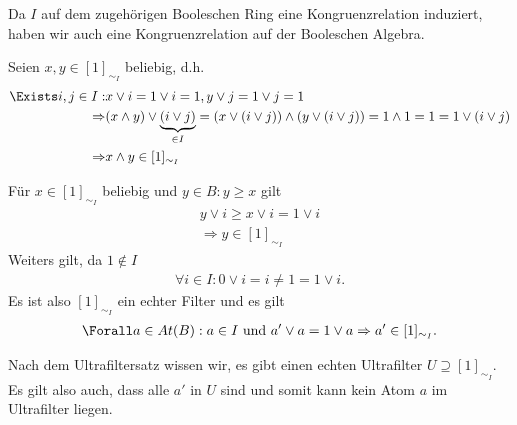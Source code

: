 \begin{solution}
Da $I$ auf dem zugehörigen Booleschen Ring eine Kongruenzrelation induziert,
haben wir auch eine Kongruenzrelation auf der Booleschen Algebra.

Seien $x,y \in [1]_{\sim_I}$ beliebig, d.h.
\begin{align*}
  \Exists i,j \in I: &x \lor i = 1 \lor i = 1, y \lor j = 1 \lor j = 1\\
  \Rightarrow &(x \land y) \lor \underbrace{(i \lor j)}_{\in I} = (x \lor (i \lor j)) \land (y \lor (i \lor j)) = 1 \land 1 = 1 = 1 \lor (i \lor j) \\
  \Rightarrow &x \land y \in [1]_{\sim_I}
\end{align*}

Für $x \in [1]_{\sim_I}$ beliebig und $y \in B: y \geq x$ gilt
\begin{align*}
  y \lor i \geq x \lor i = 1 \lor i \\
  \Rightarrow y \in [1]_{\sim_I}
\end{align*}
Weiters gilt, da $1 \notin I$
\begin{align*}
  \forall i \in I: 0 \lor i  = i \neq 1 = 1 \lor i.
\end{align*}
Es ist also $[1]_{\sim_I}$ ein echter Filter und es gilt
\begin{align*}
  \Forall a \in At(B): a \in I \text{ und } a'  \lor a = 1 \lor a \Rightarrow a' \in [1]_{\sim_I}.
\end{align*}

Nach dem Ultrafiltersatz wissen wir, es gibt einen echten Ultrafilter $U \supseteq [1]_{\sim_I}$. Es gilt also auch, dass alle $a'$ in $U$ sind und somit kann kein Atom $a$ im Ultrafilter liegen.

\end{solution}
